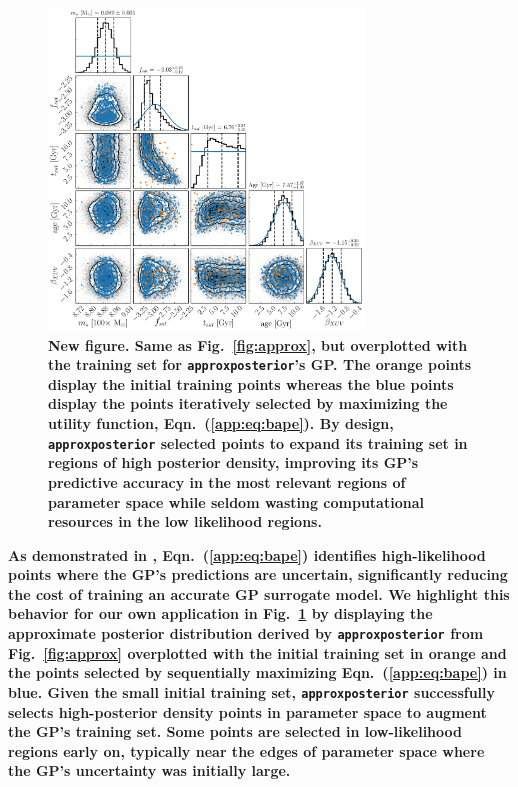 \documentclass[twocolumn]{aastex62}
\newcommand{\xxx}[1]{{\textbf{#1}}}
\newcommand{\approxposterior}[0]{\texttt{approxposterior}\xspace}
\begin{document}
\begin{figure}[h]
\centering
	\includegraphics[width=0.75\textwidth]{../Analysis/Validation/points.pdf}
   \caption{\xxx{New figure. Same as Fig.~\ref{fig:approx}, but overplotted with the training set for \approxposterior's GP. The orange points display the initial training points whereas the blue points display the points iteratively selected by maximizing the \citet{Kandasamy2017} utility function, Eqn.~(\ref{app:eq:bape}). By design, \approxposterior selected points to expand its training set in regions of high posterior density, improving its GP's predictive accuracy in the most relevant regions of parameter space while seldom wasting computational resources in the low likelihood regions.}}%
    \label{fig:points}%
\end{figure}

\xxx{As demonstrated in \citet{Kandasamy2017}, Eqn.~(\ref{app:eq:bape}) identifies high-likelihood points where the GP's predictions are uncertain, significantly reducing the cost of training an accurate GP surrogate model. We highlight this behavior for our own application in Fig.~\ref{fig:points} by displaying the approximate posterior distribution derived by \approxposterior from Fig.~\ref{fig:approx} overplotted with the initial training set in orange and the points selected by sequentially maximizing Eqn.~(\ref{app:eq:bape}) in blue. Given the small initial training set, \approxposterior successfully selects high-posterior density points in parameter space to augment the GP's training set. Some points are selected in low-likelihood regions early on, typically near the edges of parameter space where the GP's uncertainty was initially large.}
\end{document}
